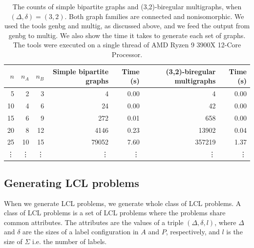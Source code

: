 
\begin{table}[H]
  \centering
  \begin{adjustbox}{width={\textwidth},keepaspectratio}%
  \begin{tabular}{r|rr|rr|rr}
    \toprule
    $n$& $n_A$ & $n_B$ & Simple bipartite graphs & Time (s) & (3,2)-biregular multigraphs  & Time (s)\\
    \midrule
    5   & 2 & 3   & 4  & 0.00    & 4     & 0.00\\
    10  & 4 & 6   & 24  & 0.00   & 42    & 0.00\\
    15  & 6 & 9   & 272  & 0.01  & 658   & 0.00\\
    20  & 8 & 12  & 4146 & 0.23  & 13902 & 0.04\\
    25  & 10 & 15 & 79052 & 7.60 & 357219& 1.37\\
    \vdots & \vdots &\vdots&\vdots&\vdots&\vdots&\vdots\\
    \bottomrule
  \end{tabular}
  \end{adjustbox}
  \caption{%
    The counts of simple bipartite graphs and (3,2)-biregular multigraphs, when $(\Delta, \delta) = (3, 2)$.
    Both graph families are connected and nonisomorphic.
    We used the tools genbg and multig, as discussed above, and we feed the output from genbg to multig.
    We also show the time it takes to generate each set of graphs.
    The tools were executed on a single thread of AMD Ryzen 9 3900X 12-Core Processor.
  }
  \label{tbl:graph_count_nonisomorphicasdasd}
\end{table}


\subsection{Generating LCL problems}

When we generate LCL problems, we generate whole class of LCL problems.
A class of LCL problems is a set of LCL problems where the problems share common attributes.
The attributes are the values of a triple $(\Delta, \delta, l)$, where $\Delta$ and $\delta$ are the sizes of a label configuration in $A$ and $P$, respectively, and $l$ is the size of $\Sigma$ i.e. the number of labels.

